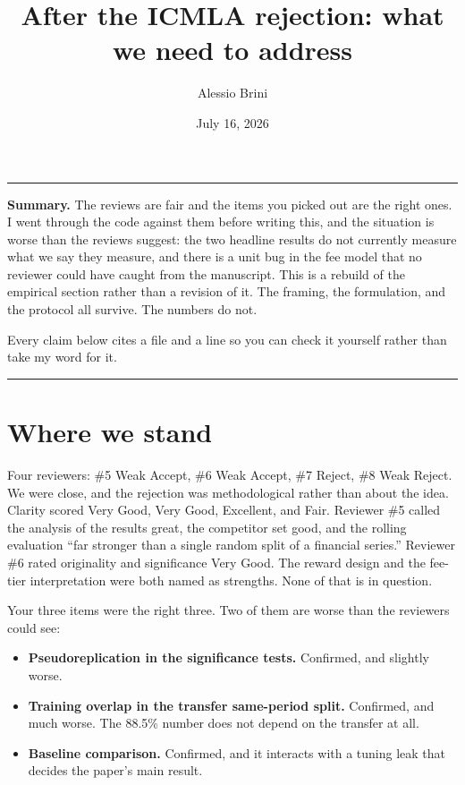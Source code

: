 \documentclass[11pt,a4paper]{article}
\title{\vspace{-1.2cm}\textbf{After the ICMLA rejection: what we need to address}}
\author{Alessio Brini}
\date{July 16, 2026}
\begin{document}
\maketitle
\vspace{-0.6cm}

\noindent\rule{\textwidth}{0.4pt}
\vspace{0.2cm}

\noindent\textbf{Summary.} The reviews are fair and the items you picked out are the right ones.
I went through the code against them before writing this, and the situation is worse than the
reviews suggest: the two headline results do not currently measure what we say they measure, and
there is a unit bug in the fee model that no reviewer could have caught from the manuscript. This
is a rebuild of the empirical section rather than a revision of it. The framing, the formulation,
and the protocol all survive. The numbers do not.

\noindent Every claim below cites a file and a line so you can check it yourself rather than take
my word for it.

\vspace{0.2cm}
\noindent\rule{\textwidth}{0.4pt}

\section{Where we stand}

Four reviewers: \#5 Weak Accept, \#6 Weak Accept, \#7 Reject, \#8 Weak Reject. We were close, and
the rejection was methodological rather than about the idea. Clarity scored Very Good, Very Good,
Excellent, and Fair. Reviewer \#5 called the analysis of the results great, the competitor set
good, and the rolling evaluation ``far stronger than a single random split of a financial
series.'' Reviewer \#6 rated originality and significance Very Good. The reward design and the
fee-tier interpretation were both named as strengths. None of that is in question.

Your three items were the right three. Two of them are worse than the reviewers could see:

\begin{itemize}
  \item \textbf{Pseudoreplication in the significance tests.} Confirmed, and slightly worse.
  \item \textbf{Training overlap in the transfer same-period split.} Confirmed, and much worse.
        The 88.5\% number does not depend on the transfer at all.
  \item \textbf{Baseline comparison.} Confirmed, and it interacts with a tuning leak that decides
        the paper's main result.
\end{itemize}
\end{document}
